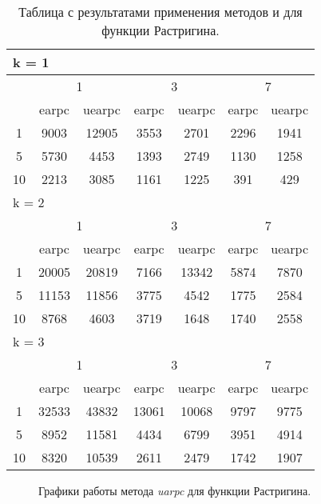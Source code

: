 \begin{table}
  \centering
  \begin{tabular}{|*7{c|}}
    \hline
    \multicolumn{7}{|l|}{k = 1} \\
    \hline
    \multirow{2}{*}{\diagbox{$\mu$}{$\lambda$}} & \multicolumn{2}{c|}{1} & \multicolumn{2}{c|}{3} & \multicolumn{2}{c|}{7} \\
    \cline{2-7}
    & earpc & uearpc & earpc & uearpc & earpc & uearpc \\
    \hline
    1 & 9003 & 12905 & 3553& 2701 & 2296 & 1941 \\
    \hline
    5 & 5730 & 4453 & 1393 & 2749 & 1130 & 1258 \\
    \hline
    10 & 2213 & 3085 & 1161 & 1225 & 391 & 429 \\
    \hline
    \multicolumn{7}{|l|}{k = 2} \\
    \hline
    \multirow{2}{*}{\diagbox{$\mu$}{$\lambda$}} & \multicolumn{2}{c|}{1} & \multicolumn{2}{c|}{3} & \multicolumn{2}{c|}{7} \\
    \cline{2-7}
    & earpc & uearpc & earpc & uearpc & earpc & uearpc \\
    \hline
    1 & 20005 & 20819 & 7166 & 13342 & 5874 & 7870 \\
    \hline
    5 & 11153 & 11856 & 3775 & 4542 & 1775 & 2584 \\
    \hline
    10 & 8768 & 4603 & 3719 & 1648 & 1740 & 2558 \\
    \hline
    \multicolumn{7}{|l|}{k = 3} \\
    \hline
    \multirow{2}{*}{\diagbox{$\mu$}{$\lambda$}} & \multicolumn{2}{c|}{1} & \multicolumn{2}{c|}{3} & \multicolumn{2}{c|}{7} \\
    \cline{2-7}
    & earpc & uearpc & earpc & uearpc & earpc & uearpc \\
    \hline
    1 & 32533 & 43832 & 13061 & 10068 & 9797 & 9775 \\
    \hline
    5 & 8952 & 11581 & 4434 & 6799 & 3951 & 4914 \\
    \hline
    10 & 8320 & 10539 & 2611 & 2479 & 1742 & 1907 \\
    \hline
  \end{tabular}
  \captionsetup{justification=centering}
  \caption{Таблица с результатами применения методов  и  для функции Растригина.}
\end{table}

\begin{figure}
  \centering
  \caption{ Графики работы метода \textit{uarpc} для функции Растригина.}
  \label{uarpc_rastrigin_plot}
\end{figure}

